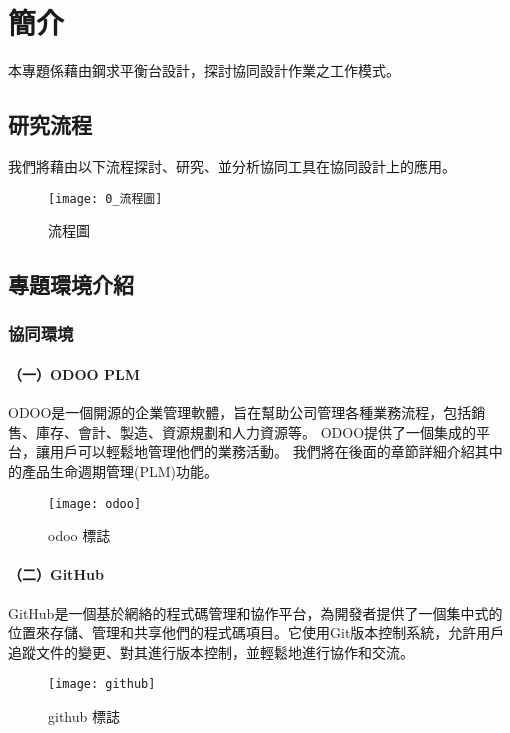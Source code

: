 \chapter{簡介}
\renewcommand{\baselinestretch}{10.0} %
\setcounter{page}{1}  %
\fontsize{14pt}{2.5pt}\sectionef

本專題係藉由鋼求平衡台設計，探討協同設計作業之工作模式。

\section{研究流程}
我們將藉由以下流程探討、研究、並分析協同工具在協同設計上的應用。\\

\begin{figure}[hbt!]
\center
\texttt{[image: 0\_流程圖]}
\caption{\Large 流程圖}\label{0_流程圖}
\end{figure}
\newpage
\section{專題環境介紹}
\subsection{協同環境}

\subsubsection{（一）ODOO PLM}

ODOO是一個開源的企業管理軟體，旨在幫助公司管理各種業務流程，包括銷售、庫存、會計、製造、資源規劃和人力資源等。
ODOO提供了一個集成的平台，讓用戶可以輕鬆地管理他們的業務活動。
我們將在後面的章節詳細介紹其中的產品生命週期管理(PLM)功能。\\
\begin{figure}[hbt!]
\center
\texttt{[image: odoo]}
\caption{\Large odoo 標誌}
\end{figure}

\subsubsection{（二）GitHub}
GitHub是一個基於網絡的程式碼管理和協作平台，為開發者提供了一個集中式的位置來存儲、管理和共享他們的程式碼項目。它使用Git版本控制系統，允許用戶追蹤文件的變更、對其進行版本控制，並輕鬆地進行協作和交流。\\
\begin{figure}[hbt!]
\center
\texttt{[image: github]}
\caption{\Large github 標誌}
\end{figure}

